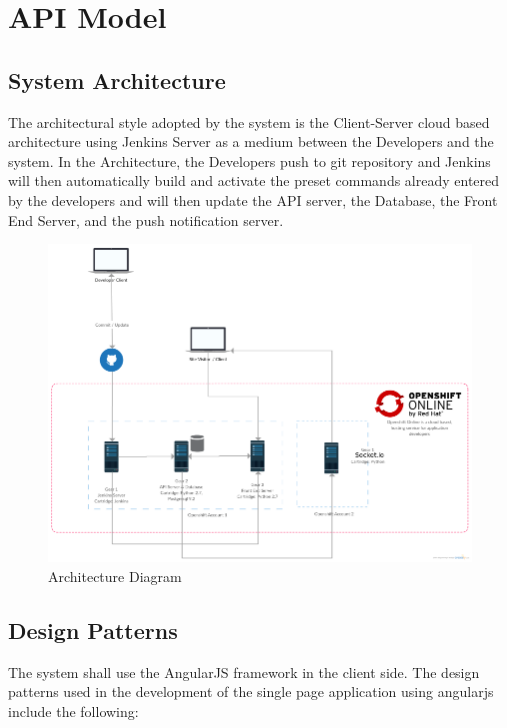 \documentclass{report}
\begin{document}
\chapter{API Model}
\section{System Architecture}
The architectural style adopted by the system is the Client-Server cloud based architecture using Jenkins Server as a medium between the Developers and the system. In the Architecture, the Developers push to git repository and Jenkins will then automatically build and activate the preset commands already entered by the developers and will then update the API server, the Database, the Front End Server, and the push notification server. 
\begin{figure}[h!]
\includegraphics[width=\linewidth]{Diagrams/ArchitectureDiagram.png}
\caption{Architecture Diagram}
\label{fig:ArchDia}
\end{figure}
\section{Design Patterns}
The system shall use the AngularJS framework in the client side. The design patterns used in the development of the single page application using angularjs include the following: 
\end{document}
